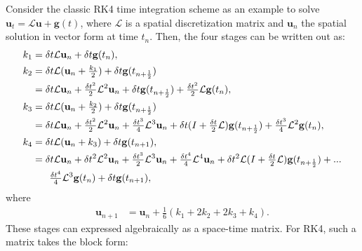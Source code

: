 \documentclass[a4paper,12pt]{article}
\begin{document}
Consider the classic RK4 time integration scheme as an example to solve $\mathbf{u}_t = \mathcal{L}\mathbf{u} + \mathbf{g}(t)$,
where $\mathcal{L}$ is a spatial discretization matrix and $\mathbf{u}_n$ the spatial solution in vector form at time $t_n$. 
Then, the four stages can be written out as:
%
\begin{align*}
k_1 & = \delta t\mathcal{L}\mathbf{u}_n + \delta t\mathbf{g}(t_n), \\
k_2 & = \delta t\mathcal{L}(\mathbf{u}_n + \tfrac{k_1}{2}) + \delta t\mathbf{g}(t_{n+\frac{1}{2}}) \\
	& = \delta t\mathcal{L}\mathbf{u}_n + \tfrac{\delta t^2}{2}\mathcal{L}^2\mathbf{u}_n + \delta t\mathbf{g}(t_{n+\frac{1}{2}}) +
	\tfrac{\delta t^2}{2}\mathcal{L}\mathbf{g}(t_n) ,\\
k_3 & = \delta t\mathcal{L}(\mathbf{u}_n + \tfrac{k_2}{2}) + \delta t\mathbf{g}(t_{n+\frac{1}{2}}) \\
	& = \delta t\mathcal{L}\mathbf{u}_n + \tfrac{\delta t^2}{2}\mathcal{L}^2\mathbf{u}_n + \tfrac{\delta t^3}{4}\mathcal{L}^3\mathbf{u}_n +
	\delta t(I+\tfrac{\delta t}{2}\mathcal{L})\mathbf{g}(t_{n+\frac{1}{2}}) + \tfrac{\delta t^3}{4}\mathcal{L}^2\mathbf{g}(t_n), \\
k_4 & = \delta t\mathcal{L}(\mathbf{u}_n + k_3) + \delta t \mathbf{g}(t_{n+1}), \\
	& = \delta t\mathcal{L}\mathbf{u}_n + \delta t^2\mathcal{L}^2\mathbf{u}_n + \tfrac{\delta t^3}{2}\mathcal{L}^3\mathbf{u}_n +
	\tfrac{\delta t^4}{4}\mathcal{L}^4\mathbf{u}_n + \delta t^2\mathcal{L}(I+\tfrac{\delta t}{2}\mathcal{L})\mathbf{g}(t_{n+\frac{1}{2}}) +
	 ...\\&\hspace{4ex} \tfrac{\delta t^4}{4}\mathcal{L}^3\mathbf{g}(t_n) + \delta t \mathbf{g}(t_{n+1}),
\end{align*}
%
where 
%
\begin{align*}
\mathbf{u}_{n+1} & = \mathbf{u}_n + \tfrac{1}{6}(k_1+2k_2+2k_3+k_4).
\end{align*}
%
These stages can expressed algebraically as a space-time matrix. For RK4, such a matrix takes the block form:
%
\end{document}

